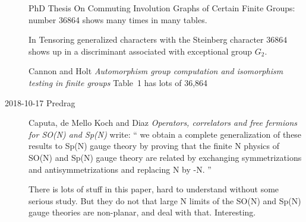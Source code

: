 \begin{description}
PhD Thesis
{On Commuting Involution Graphs of Certain Finite Groups}:  number 36864
shows many times in many tables.

In  {Tensoring generalized characters
with the Steinberg character}
$36864$ shows up in a discriminant associated with exceptional group
$G_2$.

 {Cannon and Holt}
{\em Automorphism group computation and
isomorphism testing in finite groups} Table~1 has lots of 36,864

\item[2018-10-17 Predrag]
Caputa, de Mello Koch and Diaz
{\em Operators, correlators and free fermions for {SO(N) and Sp(N)}}
write: ``
we obtain a complete generalization of these results to Sp(N) gauge theory by
proving that the finite N physics of SO(N) and Sp(N) gauge theory are related
by exchanging symmetrizations and antisymmetrizations and replacing N by -N.
''

There is lots of stuff in this paper, hard to understand without some serious study.
But they do not that large N limits of the SO(N) and Sp(N) gauge theories
are non-planar, and deal with that. Interesting.



\end{description}


\printbibliography[heading=subbibintoc,title={References}]
